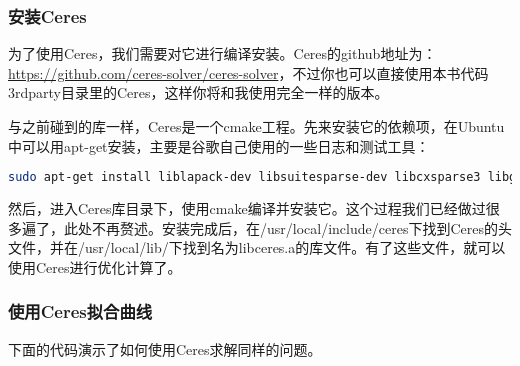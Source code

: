 \subsubsection{安装Ceres}
为了使用Ceres，我们需要对它进行编译安装。Ceres的github地址为：\url{https://github.com/ceres-solver/ceres-solver}，不过你也可以直接使用本书代码3rdparty目录里的Ceres，这样你将和我使用完全一样的版本。

与之前碰到的库一样，Ceres是一个cmake工程。先来安装它的依赖项，在Ubuntu中可以用apt-get安装，主要是谷歌自己使用的一些日志和测试工具：
\begin{lstlisting}[language=sh,caption=终端输入：]
sudo apt-get install liblapack-dev libsuitesparse-dev libcxsparse3 libgflags-dev libgoogle-glog-dev libgtest-dev 
\end{lstlisting}

然后，进入Ceres库目录下，使用cmake编译并安装它。这个过程我们已经做过很多遍了，此处不再赘述。安装完成后，在/usr/local/include/ceres下找到Ceres的头文件，并在/usr/local/lib/下找到名为libceres.a的库文件。有了这些文件，就可以使用Ceres进行优化计算了。

\subsubsection{使用Ceres拟合曲线}
下面的代码演示了如何使用Ceres求解同样的问题。

